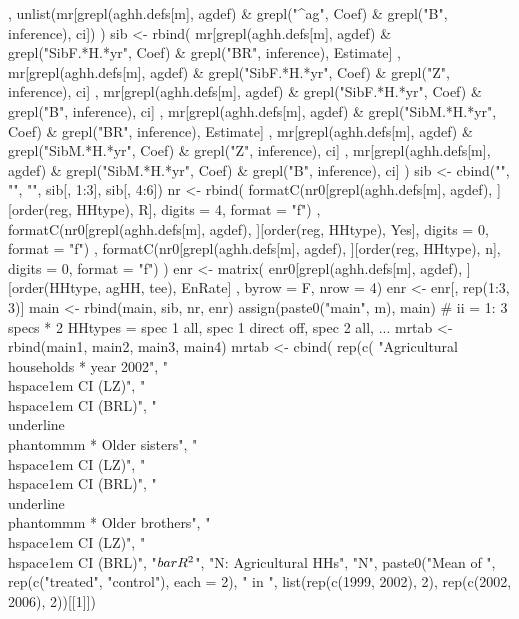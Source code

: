 \begin{Schunk}
\begin{Sinput}
{{{        ,
        unlist(mr[grepl(aghh.defs[m], agdef) & grepl("^ag", Coef) & grepl("B", inference), ci])
      )
      sib <-  rbind(
         mr[grepl(aghh.defs[m], agdef)  & grepl("SibF.*H.*yr", Coef) & grepl("BR", inference), Estimate]
         , 
         mr[grepl(aghh.defs[m], agdef) & grepl("SibF.*H.*yr", Coef) & grepl("Z", inference), ci]
         ,
         mr[grepl(aghh.defs[m], agdef) & grepl("SibF.*H.*yr", Coef) & grepl("B", inference), ci]
         ,
         mr[grepl(aghh.defs[m], agdef) & grepl("SibM.*H.*yr", Coef) & grepl("BR", inference), Estimate]
         , 
         mr[grepl(aghh.defs[m], agdef) & grepl("SibM.*H.*yr", Coef) & grepl("Z", inference), ci]
         ,
         mr[grepl(aghh.defs[m], agdef) & grepl("SibM.*H.*yr", Coef) & grepl("B", inference), ci]
       )
       sib <- cbind("", "", "", sib[, 1:3], sib[, 4:6])
       nr <- rbind(
          formatC(nr0[grepl(aghh.defs[m], agdef), ][order(reg, HHtype), R], digits = 4, format = "f")
        , formatC(nr0[grepl(aghh.defs[m], agdef), ][order(reg, HHtype), Yes], digits = 0, format = "f")
        , formatC(nr0[grepl(aghh.defs[m], agdef), ][order(reg, HHtype), n], digits = 0, format = "f")
       )
       enr <- matrix(
         enr0[grepl(aghh.defs[m], agdef), ][order(HHtype, agHH, tee), EnRate]
         , byrow = F, nrow = 4)
       enr <- enr[, rep(1:3, 3)]
       main <- rbind(main, sib, nr, enr)
       assign(paste0("main", m), main)
    }
    # ii = 1: 3 specs * 2 HHtypes = spec 1 all, spec 1 direct off, spec 2 all, ...
    mrtab <- rbind(main1, main2, main3, main4)
    mrtab <- 
      cbind(
          rep(c(
            "Agricultural households * year 2002", 
            "\\hspace{1em} CI (LZ)", "\\hspace{1em} CI (BRL)", 
            "\\underline{\\phantom{mm}} * Older sisters",
            "\\hspace{1em} CI (LZ)", "\\hspace{1em} CI (BRL)", 
            "\\underline{\\phantom{mm}} * Older brothers",
            "\\hspace{1em} CI (LZ)", "\\hspace{1em} CI (BRL)", 
            "$\\bar{R}^{2}$", "N: Agricultural HHs", "N",
            paste0("Mean of ", rep(c("treated", "control"), each = 2), " in ", 
              list(rep(c(1999, 2002), 2), rep(c(2002, 2006), 2))[[1]])
}}
\end{Sinput}
\end{Schunk}
